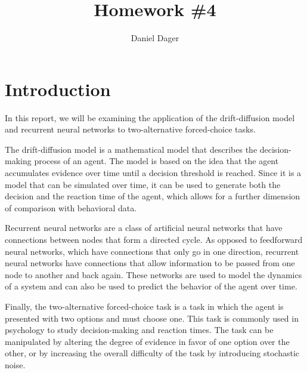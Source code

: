 \documentclass{article}
\makeatletter
\renewcommand{\maketitle}{
    {\raggedleft  %
    \vspace*{-10pt}  %
    {\large\@title \par}  %
    \vspace{5pt}  %
    {\normalsize\@author \par}
    \vspace{5pt}  %
    {\normalsize\@date \par}
    \vspace{20pt}}  %
}
\makeatother
\begin{document}
\title{Homework \#4}
\author{Daniel Dager}
\date{}
\maketitle

\pagestyle{empty} %
\thispagestyle{empty}

\renewcommand{\thesection}{1.\arabic{section}}


\section*{Introduction}

In this report, we will be examining the application of the drift-diffusion model and recurrent neural networks to two-alternative forced-choice tasks.
\vspace{1em}

The drift-diffusion model is a mathematical model that describes the decision-making process of an agent. The model is based on the idea that the agent accumulates evidence over time until a decision threshold is reached. Since it is a model that can be simulated over time, it can be used to generate both the decision and the reaction time of the agent, which allows for a further dimension of comparison with behavioral data.
\vspace{1em}

Recurrent neural networks are a class of artificial neural networks that have connections between nodes that form a directed cycle. As opposed to feedforward neural networks, which have connections that only go in one direction, recurrent neural networks have connections that allow information to be passed from one node to another and back again. These networks are used to model the dynamics of a system and can also be used to predict the behavior of the agent over time.
\vspace{1em}

Finally, the two-alternative forced-choice task is a task in which the agent is presented with two options and must choose one. This task is commonly used in psychology to study decision-making and reaction times. The task can be manipulated by altering the degree of evidence in favor of one option over the other, or by increasing the overall difficulty of the task by introducing stochastic noise. 
\vspace{1em}


\section{}
\end{document}
